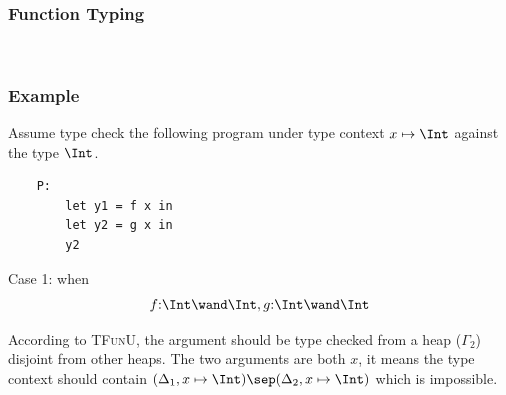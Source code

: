 \begin{frame}[fragile]
    \frametitle{Function Typing}   

    \begin{figure}[!ht]
    \quad
    \\[.8em]
    \quad
    \end{figure}
\end{frame}

\begin{frame}[fragile]
    \frametitle{Example}

    Assume type check the following program under type context $x\mapsto\Int$ against the type $\Int$.

    \begin{verbatim}
    P:
        let y1 = f x in
        let y2 = g x in
        y2
    \end{verbatim}
    
    Case 1: when
    \begin{align*}
        f{:}\Int \wand \Int, g{:}\Int \wand \Int
    \end{align*}

    According to \textsc{TFunU}, the argument should be type checked from a heap ($\Gamma_2$) disjoint from other heaps. The two arguments are both $x$, it means the type context should contain $(\Delta_1, x\mapsto\Int) \sep (\Delta_2, x\mapsto\Int)$ which is impossible.

\end{frame}

